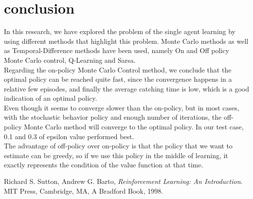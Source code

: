 \documentclass[paper=a4, fontsize=11pt]{scrartcl}
\numberwithin{equation}{section}		%
\numberwithin{figure}{section}			%
\numberwithin{table}{section}				%
\begin{document}
\section{conclusion}
\label{discussion}
In this research, we have explored the problem of the single agent learning by using different methods that highlight this problem. Monte Carlo methods as well as Temporal-Difference methods have been used, namely On and Off policy Monte Carlo control, Q-Learning and Sarsa.\\
Regarding the on-policy Monte Carlo Control method, we conclude that the optimal policy can be reached quite fast, since the convergence happens in a relative few episodes, and finally the average catching time is low, which is a good indication of an optimal policy.\\
Even though it seems to converge slower than the on-policy, but in most cases, with the stochastic behavior policy and enough number of iterations, the off-policy Monte Carlo method will converge to the optimal policy. In our test case, 0.1 and 0.3 of epsilon value performed best.\\
The advantage of off-policy over on-policy is that the policy that we want to estimate can be greedy, so if we use this policy in the middle of learning, it exactly represents the condition of the value function at that time.



\begin{thebibliography}{9}

  Richard S. Sutton, Andrew G. Barto,
  \emph{Reinforcement Learning: An Introduction}.
  MIT Press, Cambridge, MA, 
  A Bradford Book,
  1998.

\end{thebibliography}

\end{document}
